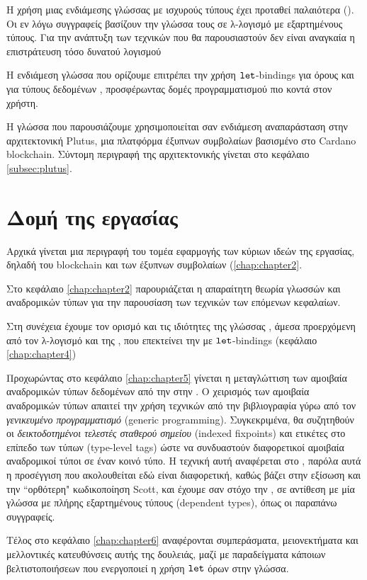   Η χρήση μιας ενδιάμεσης γλώσσας με ισχυρούς τύπους έχει προταθεί παλαιότερα (\cite{henk}). Οι εν λόγω
  συγγραφείς βασίζουν την γλώσσα τους σε λ-λογισμό με εξαρτημένους τύπους. Για την ανάπτυξη των τεχνικών που θα παρουσιαστούν δεν είναι αναγκαία η επιστράτευση τόσο δυνατού λογισμού

  Η ενδιάμεση γλώσσα που ορίζουμε επιτρέπει την χρήση $\operatorname{\texttt{let}}$-bindings για όρους και για τύπους δεδομένων
  , προσφέρωντας δομές προγραμματισμού πιο κοντά στον χρήστη.

  Η γλώσσα που παρουσιάζουμε χρησιμοποιείται σαν ενδιάμεση αναπαράσταση στην αρχιτεκτονική Plutus,
  μια πλατφόρμα έξυπνων συμβολαίων βασισμένο στο Cardano blockchain. Σύντομη περιγραφή της
  αρχιτεκτονικής γίνεται στο κεφάλαιο \ref{subsec:plutus}.

  \section{Δομή της εργασίας}

  Αρχικά γίνεται μια περιγραφή του τομέα εφαρμογής των κύριων ιδεών της εργασίας, 
  δηλαδή του blockchain και των έξυπνων συμβολαίων (\ref{chap:chapter2}.

     Στο κεφάλαιο \ref{chap:chapter2}  παρουριάζεται η απαραίτητη θεωρία γλωσσών και αναδρομικών τύπων 
      για την παρουσίαση των τεχνικών των επόμενων κεφαλαίων.

      Στη συνέχεια έχουμε τον ορισμό και τις ιδιότητες της γλώσσας \FOMF{}, άμεσα προερχόμενη από
      τον λ-λογισμό και της \FIR{}, που επεκτείνει την \FOMF{} με $\operatorname{\texttt{let}}$-bindings (κεφάλαιο \ref{chap:chapter4})

        Προχωρώντας στο κεφάλαιο \ref{chap:chapter5} γίνεται η μεταγλώττιση των αμοιβαία αναδρομικών τύπων
        δεδομένων από την \FIR{} στην \FOMF{}. Ο χειρισμός των αμοιβαία αναδρομικών τύπων απαιτεί
        την χρήση τεχνικών από την βιβλιογραφία γύρω από τον \emph{γενικευμένο προγραμματισμό} (generic 
          programming). Συγκεκριμένα, θα  συζητηθούν οι \emph{δεικτοδοτημένοι τελεστές σταθερού σημείου} 
        (indexed fixpoints) και ετικέτες στο επίπεδο των τύπων (type-level tags) ώστε να συνδυαστούν 
        διαφορετικοί αμοιβαία αναδρομικοί τύποι σε έναν κοινό τύπο. Η τεχνική αυτή αναφέρεται στο 
        \cite{fixmutualgeneric}, παρόλα αυτά η προσέγγιση που ακολουθείται εδώ είναι διαφορετική,
        καθώς βάζει στην εξίσωση και την ``ορθότερη" κωδικοποίηση Scott, και έχουμε σαν στόχο την \FOMF{},
        σε αντίθεση με μία γλώσσα με πλήρης εξαρτημένους τύπους (dependent types), όπως οι παραπάνω
        συγγραφείς.
        
        Tέλος στο κεφάλαιο \ref{chap:chapter6} αναφέρονται  συμπεράσματα, μειονεκτήματα και μελλοντικές κατευθύνσεις αυτής της δουλειάς, μαζί με παραδείγματα κάποιων βελτιστοποιήσεων που ενεργοποιεί η 
        χρήση $\operatorname{\texttt{let}}$ όρων στην γλώσσα.
        
        
